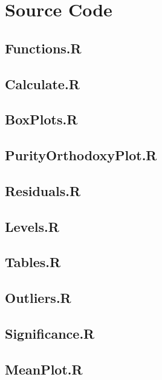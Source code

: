 \chapter{Source Code}

\section{Functions.R}\label{src:functions}


\section{Calculate.R}\label{src:calculate}


\section{BoxPlots.R}\label{src:boxPlots}


\section{PurityOrthodoxyPlot.R}\label{src:purityOrthodoxyPlot}


\section{Residuals.R}\label{src:residuals}


\section{Levels.R}\label{src:levels}


\section{Tables.R}\label{src:tables}


\section{Outliers.R}\label{src:outliers}


\section{Significance.R}\label{src:significance}


\section{MeanPlot.R}\label{src:meanPlot}


